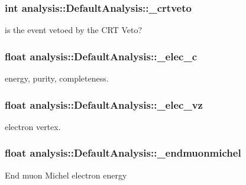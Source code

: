 \subsubsection[{\texorpdfstring{\+\_\+crtveto}{_crtveto}}]{\setlength{\rightskip}{0pt plus 5cm}int analysis\+::\+Default\+Analysis\+::\+\_\+crtveto\hspace{0.3cm}{\ttfamily [private]}}\hypertarget{classanalysis_1_1DefaultAnalysis_a84ce9904fa527012a65c2be203a38d38}{}\label{classanalysis_1_1DefaultAnalysis_a84ce9904fa527012a65c2be203a38d38}
is the event vetoed by the C\+RT Veto? 
\subsubsection[{\texorpdfstring{\+\_\+elec\+\_\+c}{_elec_c}}]{\setlength{\rightskip}{0pt plus 5cm}float analysis\+::\+Default\+Analysis\+::\+\_\+elec\+\_\+c\hspace{0.3cm}{\ttfamily [private]}}\hypertarget{classanalysis_1_1DefaultAnalysis_a5ce51cfe745fbf0327541a1877a99f87}{}\label{classanalysis_1_1DefaultAnalysis_a5ce51cfe745fbf0327541a1877a99f87}
energy, purity, completeness. 
\subsubsection[{\texorpdfstring{\+\_\+elec\+\_\+vz}{_elec_vz}}]{\setlength{\rightskip}{0pt plus 5cm}float analysis\+::\+Default\+Analysis\+::\+\_\+elec\+\_\+vz\hspace{0.3cm}{\ttfamily [private]}}\hypertarget{classanalysis_1_1DefaultAnalysis_ad728b8375e4d62c128d767fcebbab1d9}{}\label{classanalysis_1_1DefaultAnalysis_ad728b8375e4d62c128d767fcebbab1d9}
electron vertex. 
\subsubsection[{\texorpdfstring{\+\_\+endmuonmichel}{_endmuonmichel}}]{\setlength{\rightskip}{0pt plus 5cm}float analysis\+::\+Default\+Analysis\+::\+\_\+endmuonmichel\hspace{0.3cm}{\ttfamily [private]}}\hypertarget{classanalysis_1_1DefaultAnalysis_a3797bcb310074825add03ce03175fdc3}{}\label{classanalysis_1_1DefaultAnalysis_a3797bcb310074825add03ce03175fdc3}
End muon Michel electron energy 
